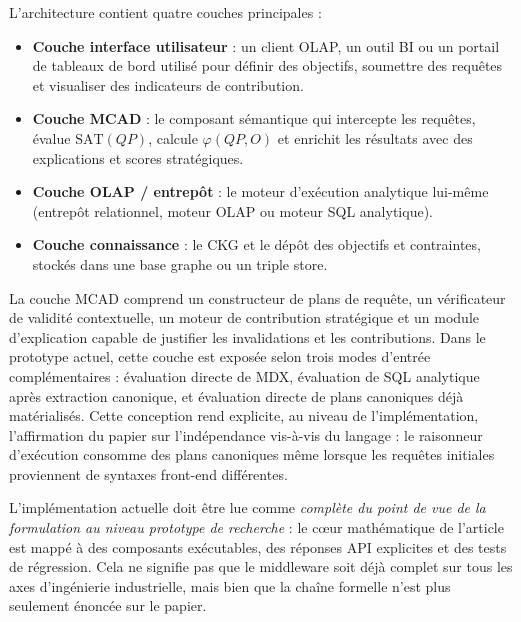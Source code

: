 \documentclass[journal]{IEEEtran}
\begin{document}
L'architecture contient quatre couches principales :
\begin{itemize}
  \item \textbf{Couche interface utilisateur} : un client OLAP, un outil BI ou un portail de tableaux de bord utilisé pour définir des objectifs, soumettre des requêtes et visualiser des indicateurs de contribution.
  \item \textbf{Couche MCAD} : le composant sémantique qui intercepte les requêtes, évalue $\mathrm{SAT}(QP)$, calcule $\varphi(QP,O)$ et enrichit les résultats avec des explications et scores stratégiques.
  \item \textbf{Couche OLAP / entrepôt} : le moteur d'exécution analytique lui-même (entrepôt relationnel, moteur OLAP ou moteur SQL analytique).
  \item \textbf{Couche connaissance} : le CKG et le dépôt des objectifs et contraintes, stockés dans une base graphe ou un triple store.
\end{itemize}
La couche MCAD comprend un constructeur de plans de requête, un vérificateur de validité contextuelle, un moteur de contribution stratégique et un module d'explication capable de justifier les invalidations et les contributions. Dans le prototype actuel, cette couche est exposée selon trois modes d'entrée complémentaires : évaluation directe de MDX, évaluation de SQL analytique après extraction canonique, et évaluation directe de plans canoniques déjà matérialisés. Cette conception rend explicite, au niveau de l'implémentation, l'affirmation du papier sur l'indépendance vis-à-vis du langage : le raisonneur d'exécution consomme des plans canoniques même lorsque les requêtes initiales proviennent de syntaxes front-end différentes.

L'implémentation actuelle doit être lue comme \emph{complète du point de vue de la formulation au niveau prototype de recherche} : le cœur mathématique de l'article est mappé à des composants exécutables, des réponses API explicites et des tests de régression. Cela ne signifie pas que le middleware soit déjà complet sur tous les axes d'ingénierie industrielle, mais bien que la chaîne formelle n'est plus seulement énoncée sur le papier.
\end{document}
